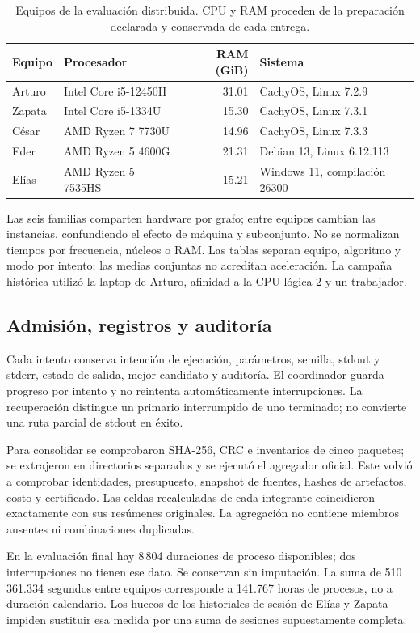 \begin{table}[H]\centering\small
\caption{Equipos de la evaluación distribuida. CPU y RAM proceden de la preparación declarada y conservada de cada entrega.}
\begin{tabularx}{\linewidth}{lYrY}\toprule
Equipo & Procesador & RAM (GiB) & Sistema \\ \midrule
Arturo & Intel Core i5-12450H & 31.01 & CachyOS, Linux 7.2.9\\
Zapata & Intel Core i5-1334U & 15.30 & CachyOS, Linux 7.3.1\\
César & AMD Ryzen 7 7730U & 14.96 & CachyOS, Linux 7.3.3\\
Eder & AMD Ryzen 5 4600G & 21.31 & Debian 13, Linux 6.12.113\\
Elías & AMD Ryzen 5 7535HS & 15.21 & Windows 11, compilación 26300\\
\bottomrule\end{tabularx}
\end{table}

Las seis familias comparten hardware por grafo; entre equipos cambian las instancias, confundiendo el efecto de máquina y subconjunto. No se normalizan tiempos por frecuencia, núcleos o RAM. Las tablas separan equipo, algoritmo y modo por intento; las medias conjuntas no acreditan aceleración. La campaña histórica utilizó la laptop de Arturo, afinidad a la CPU lógica 2 y un trabajador.

\subsection{Admisión, registros y auditoría}
Cada intento conserva intención de ejecución, parámetros, semilla, stdout y stderr, estado de salida, mejor candidato y auditoría. El coordinador guarda progreso por intento y no reintenta automáticamente interrupciones. La recuperación distingue un primario interrumpido de uno terminado; no convierte una ruta parcial de stdout en éxito.

Para consolidar se comprobaron SHA-256, CRC e inventarios de cinco paquetes; se extrajeron en directorios separados y se ejecutó el agregador oficial. Este volvió a comprobar identidades, presupuesto, snapshot de fuentes, hashes de artefactos, costo y certificado. Las celdas recalculadas de cada integrante coincidieron exactamente con sus resúmenes originales. La agregación no contiene miembros ausentes ni combinaciones duplicadas.

En la evaluación final hay 8\,804 duraciones de proceso disponibles; dos interrupciones no tienen ese dato. Se conservan sin imputación. La suma de 510\,361.334 segundos entre equipos corresponde a 141.767 horas de procesos, no a duración calendario. Los huecos de los historiales de sesión de Elías y Zapata impiden sustituir esa medida por una suma de sesiones supuestamente completa.

